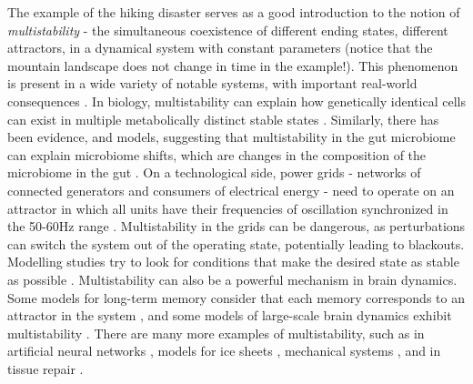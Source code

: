 The example of the hiking disaster serves as a good introduction to the notion of \textit{multistability} - the simultaneous coexistence of different ending states, different attractors, in a dynamical system with constant parameters (notice that the mountain landscape does not change in time in the example!). This phenomenon is present in a wide variety of notable systems, with important real-world consequences \cite{feudel2008complex, pisarchik2022multistability, pisarchik2014control}. In biology, multistability can explain how genetically identical cells can exist in multiple metabolically distinct stable states \cite{zhu2022synthetic, regan2012dynamical}. Similarly, there has been evidence, and models, suggesting that multistability in the gut microbiome can explain microbiome shifts, which are changes in the composition of the microbiome in the gut \cite{khazaei2022metabolic}. On a technological side, power grids - networks of connected generators and consumers of electrical energy - need to operate on an attractor in which all units have their frequencies of oscillation synchronized in the 50-60Hz range \cite{hellmann2020network}. Multistability in the grids can be dangerous, as perturbations can switch the system out of the operating state, potentially leading to blackouts. Modelling studies try to look for conditions that make the desired state as stable as possible \cite{hellmann2020network, halekotte2021transient}. Multistability can also be a powerful mechanism in brain dynamics. Some models for long-term memory consider that each memory corresponds to an attractor in the system \cite{wilson1972excitatory, foss1996multistability}, and some models of large-scale brain dynamics exhibit multistability \cite{golos2015multistability}. There are many more examples of multistability, such as in artificial neural networks \cite{flynn2024exploring}, models for ice sheets \cite{robinson2012multistability}, mechanical systems \cite{feudel1998dynamical}, and in tissue repair \cite{adler2020principles}.

